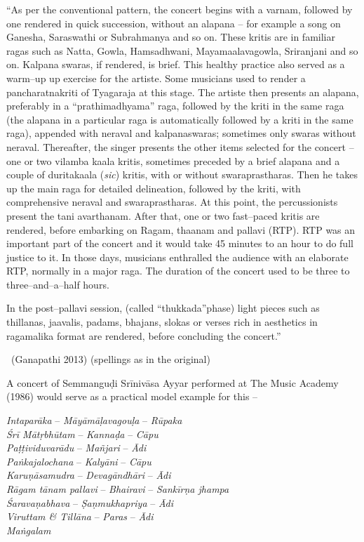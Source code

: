 \begin{myquote}
“As per the conventional pattern, the concert begins with a varnam, followed by one rendered in quick succession, without an alapana – for example a song on Ganesha, Saraswathi or Subrahmanya and so on. These kritis are in familiar ragas such as Natta, Gowla, Hamsadhwani, Mayamaalavagowla, Sriranjani and so on. Kalpana swaras, if rendered, is brief. This healthy practice also served as a warm–up up exercise for the artiste. Some musicians used to render a pancharatnakriti of Tyagaraja at this stage. The artiste then presents an alapana, preferably in a “prathimadhyama” raga, followed by the kriti in the same raga (the alapana in a particular raga is automatically followed by a kriti in the same raga), appended with neraval and kalpanaswaras; sometimes only swaras without neraval. Thereafter, the singer presents the other items selected for the concert – one or two vilamba kaala kritis, sometimes preceded by a brief alapana and a couple of duritakaala (\textit{sic}) kritis, with or without swaraprastharas. Then he takes up the main raga for detailed delineation, followed by the kriti, with comprehensive neraval and swaraprastharas. At this point, the percussionists present the tani avarthanam. After that, one or two fast–paced kritis are rendered, before embarking on Ragam, thaanam and pallavi (RTP). RTP was an important part of the concert and it would take 45 minutes to an hour to do full justice to it. In those days, musicians enthralled the audience with an elaborate RTP, normally in a major raga. The duration of the concert used to be three to three–and–a–half hours.
\end{myquote}

\begin{myquote}
In the post–pallavi session, (called “thukkada”phase) light pieces such as thillanas, jaavalis, padams, bhajans, slokas or verses rich in aesthetics in ragamalika format are rendered, before concluding the concert.” 

~\hfill (Ganapathi 2013) (spellings as in the original)
\end{myquote}

A concert of Semmanguḍi Srīnivāsa Ayyar performed at The Music Academy (1986) would serve as a practical model example for this –

\textit{Intaparāka} – \textit{Māyāmāḷavagouḷa} – \textit{Rūpaka}\\\textit{Śrī Mātṛbhūtam} – \textit{Kannaḍa} – \textit{Cāpu}\\\textit{Paṭṭividuvarādu} – \textit{Mañjari} – \textit{Ādi}\\\textit{Paṅkajalochana} – \textit{Kalyāni} – \textit{Cāpu} \\\textit{Karuṇāsamudra} – \textit{Devagāndhāri} – \textit{Ādi} \\\textit{Rāgam tānam pallavi} – \textit{Bhairavi} – \textit{Sankīrṇa jhampa}\\\textit{Śaravaṇabhava} – \textit{Ṣaṇmukhapriya} – \textit{Ādi}\\\textit{Viruttam \& Tillāna} – \textit{Paras} – \textit{Ādi} \\\textit{Maṅgalam}

